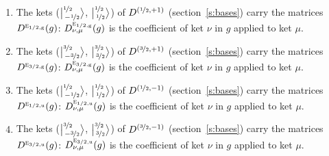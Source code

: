 \documentclass[10pt,a4paper]{article}
\numberwithin{equation}{section}
\newcommand{\irr}[1]{\text{\normalfont\scshape #1}}
\newcommand{\ptag}[1]{\mathrm{#1}}
\newcommand{\irrJp}[2]{D^{(#1,#2)}}
\newcommand{\repD}[1]{D^{#1}}
\newcommand{\intx}{\mu}
\newcommand{\jm}[2]{\bigl\lvert{}^{#1}_{\,#2}\bigr\rangle}
\newenvironment{romanlist}{\begin{enumerate}%
\renewcommand{\labelenumi}{(\roman{enumi})}}%
  {\end{enumerate}}
\begin{document}
\begin{romanlist}\raggedright
\item The kets ($\jm{\nicefrac{1}{2}}{-\nicefrac{1}{2}}$, $\jm{\nicefrac{1}{2}}{\nicefrac{1}{2}}$) of $\irrJp{\nicefrac{1}{2}}{+1}$ (section~\ref{s:bases}) carry the matrices $\repD{\irr{e}_{1/2,\ptag{g}}}(g)$: $\repD{\irr{e}_{1/2,\ptag{g}}}_{\nu,\intx}(g)$ is the coefficient of ket $\nu$ in $g$ applied to ket $\intx$.
\item The kets ($\jm{\nicefrac{3}{2}}{-\nicefrac{3}{2}}$, $\jm{\nicefrac{3}{2}}{\nicefrac{3}{2}}$) of $\irrJp{\nicefrac{3}{2}}{+1}$ (section~\ref{s:bases}) carry the matrices $\repD{\irr{e}_{3/2,\ptag{g}}}(g)$: $\repD{\irr{e}_{3/2,\ptag{g}}}_{\nu,\intx}(g)$ is the coefficient of ket $\nu$ in $g$ applied to ket $\intx$.
\item The kets ($\jm{\nicefrac{1}{2}}{-\nicefrac{1}{2}}$, $\jm{\nicefrac{1}{2}}{\nicefrac{1}{2}}$) of $\irrJp{\nicefrac{1}{2}}{-1}$ (section~\ref{s:bases}) carry the matrices $\repD{\irr{e}_{1/2,\ptag{u}}}(g)$: $\repD{\irr{e}_{1/2,\ptag{u}}}_{\nu,\intx}(g)$ is the coefficient of ket $\nu$ in $g$ applied to ket $\intx$.
\item The kets ($\jm{\nicefrac{3}{2}}{-\nicefrac{3}{2}}$, $\jm{\nicefrac{3}{2}}{\nicefrac{3}{2}}$) of $\irrJp{\nicefrac{3}{2}}{-1}$ (section~\ref{s:bases}) carry the matrices $\repD{\irr{e}_{3/2,\ptag{u}}}(g)$: $\repD{\irr{e}_{3/2,\ptag{u}}}_{\nu,\intx}(g)$ is the coefficient of ket $\nu$ in $g$ applied to ket $\intx$.
\end{romanlist}
\end{document}
